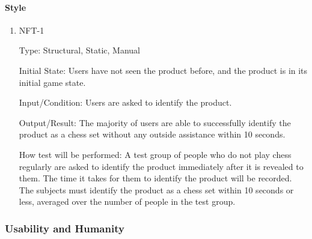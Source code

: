 \documentclass[12pt, titlepage]{article}
\begin{document}
\paragraph{Style}
\begin{enumerate}
    \item{NFT-1}
    
        Type: Structural, Static, Manual
                            
        Initial State: Users have not seen the product before, and the product is in its initial game state.
                            
        Input/Condition: Users are asked to identify the product.
                            
        Output/Result: The majority of users are able to successfully identify the product as a chess set without any outside assistance within 10 seconds.
                            
        How test will be performed: A test group of people who do not play chess regularly are asked to identify the product immediately after it is revealed to them.
            The time it takes for them to identify the product will be recorded. The subjects must identify the product as a chess set within 10 seconds or less, averaged
            over the number of people in the test group.
\end{enumerate}

\subsubsection{Usability and Humanity}
\end{document}
